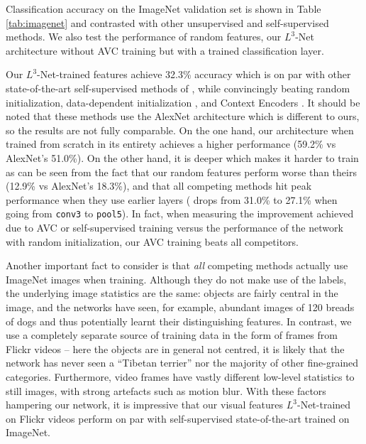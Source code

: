 \documentclass[10pt,twocolumn,letterpaper]{article}
\renewcommand{\paragraph}[1]{\smallskip\noindent{\bf{#1}}}
\begin{document}
\figUnitsV
\figUnitsVmap
\afterpage{\FloatBarrier}

\paragraph{Results and discussion.}
Classification accuracy on the ImageNet validation set is shown in
Table \ref{tab:imagenet} and contrasted with other unsupervised and
self-supervised methods.
We also test the performance of random features,
\ie our $L^3$-Net architecture without AVC training but with a trained classification
layer.

Our $L^3$-Net-trained features achieve 32.3\% accuracy which is on par with other
state-of-the-art self-supervised methods of \cite{Doersch15,Zhang16,Donahue17,Noroozi16},
while convincingly beating random initialization,
data-dependent initialization \cite{Krahenbuhl15}, and
Context Encoders \cite{Pathak16}.
It should be noted that these methods use the AlexNet \cite{Krizhevsky12} architecture
which is different to ours,
so the results are not fully comparable.
On the one hand, our architecture when trained from scratch in its entirety
achieves a higher performance (59.2\% vs AlexNet's 51.0\%).
On the other hand, it is deeper which makes it harder to train
as can be seen from the fact that our random features perform worse
than theirs (12.9\% vs AlexNet's 18.3\%), and that all competing methods hit peak
performance when they use earlier layers
(\eg \cite{Donahue17} drops from 31.0\% to 27.1\%
when going from \texttt{conv3} to \texttt{pool5}).
In fact, when measuring the improvement achieved due to AVC or self-supervised
training versus
the performance of the network with random initialization,
our AVC training beats all competitors.

Another important fact to consider is that \emph{all}
competing methods actually use ImageNet images when
training. Although they do not make use of the labels,
the underlying image statistics are the same:
objects are fairly central in the image, and the networks have seen,
for example, abundant images of 120 breads of dogs and thus potentially
learnt their distinguishing features.
In contrast, we use a completely separate source of training data in the
form of frames from Flickr videos -- here the objects are in general not
centred, it is likely that the network has never seen a ``Tibetan terrier''
nor the majority of other fine-grained categories.
Furthermore, video frames have vastly different low-level statistics to
still images, with strong artefacts such as motion blur.
With these factors hampering our network, it is impressive that our
visual features $L^3$-Net-trained on Flickr videos
perform on par with self-supervised state-of-the-art trained on ImageNet.
\end{document}
